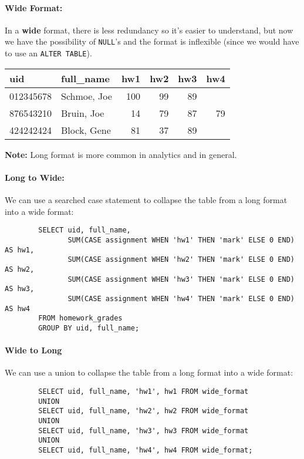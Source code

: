 \documentclass{report}
\newenvironment{example}{\begin{tcolorbox}[title={Example},colback=green!5!white,colframe=black!75!green]}{\end{tcolorbox}}
\renewcommand{\bf}[1]{\textbf{{#1}}}
\renewcommand{\tt}[1]{\texttt{{#1}}}
\begin{document}
\begin{example}
    \paragraph{Wide Format:} In a \bf{wide} format, there is less redundancy so
    it's easier to understand, but now we have the possibility of \tt{NULL}'s
    and the format is inflexible (since we would have to use an \tt{ALTER TABLE}).
    \begin{center}
        \vspace{-2em}
        \begin{tabular}{l|l|r|r|r|r}
            uid & full\_name & hw1 & hw2 & hw3 & hw4 \\
            \hline
            012345678 & Schmoe, Joe & 100 & 99 & 89 & \\
            876543210 & Bruin, Joe & 14 & 79 & 87 & 79 \\
            424242424 & Block, Gene & 81 & 37 & 89 &  \\
        \end{tabular}
    \end{center}
\bf{Note:} Long format is more common in analytics and in general.
\end{example}
\paragraph{Long to Wide:} We can use a searched case statement to collapse the
table from a long format into a wide format:
\begin{center}
    \begin{BVerbatim}
        SELECT uid, full_name,
               SUM(CASE assignment WHEN 'hw1' THEN 'mark' ELSE 0 END) AS hw1,
               SUM(CASE assignment WHEN 'hw2' THEN 'mark' ELSE 0 END) AS hw2,
               SUM(CASE assignment WHEN 'hw3' THEN 'mark' ELSE 0 END) AS hw3,
               SUM(CASE assignment WHEN 'hw4' THEN 'mark' ELSE 0 END) AS hw4
        FROM homework_grades
        GROUP BY uid, full_name;
    \end{BVerbatim}
\end{center}

\paragraph{Wide to Long} We can use a union to collapse the
table from a long format into a wide format:
\begin{center}
    \begin{BVerbatim}
        SELECT uid, full_name, 'hw1', hw1 FROM wide_format
        UNION
        SELECT uid, full_name, 'hw2', hw2 FROM wide_format
        UNION
        SELECT uid, full_name, 'hw3', hw3 FROM wide_format
        UNION
        SELECT uid, full_name, 'hw4', hw4 FROM wide_format;
    \end{BVerbatim}
\end{center}
\end{document}
